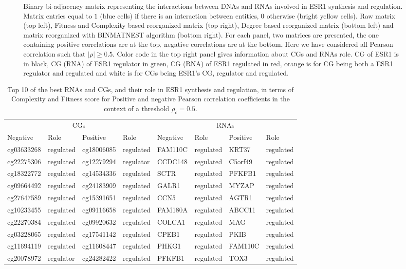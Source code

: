 \documentclass[10pt,a4paper]{article}
\begin{document}
\begin{figure}[h!]
{}
\caption{\label{fig:fig1}Binary bi-adjacency matrix representing the interactions between DNAs and RNAs involved in ESR1 synthesis and regulation. Matrix entries equal to $1$ (blue cells) if there is an interaction between entities, $0$ otherwise (bright yellow cells). Raw matrix (top left), Fitness and Complexity based reorganized matrix (top right), Degree based reorganized matrix (bottom left) and matrix reorganized with BINMATNEST algorithm (bottom right). For each panel, two matrices are presented, the one containing positive correlations are at the top, negative correlations are at the bottom. Here we have considered all Pearson correlation such that $|\rho| \geq 0.5$. Color code in the top right panel gives information about CGs and RNAs role. CG of ESR1 is in black, CG (RNA) of ESR1 regulator in green, CG (RNA) of ESR1 regulated in red, orange is for CG being both a ESR1 regulator and regulated and white is for CGs being ESR1's CG, regulator and regulated.}
\end{figure}
 \begin{table}[h!]
\centering
\caption{\label{tab:tab1}Top 10 of the best RNAs and CGs, and their role in ESR1 synthesis and regulation, in terms of Complexity and Fitness score for Positive and negative Pearson correlation coefficients in the context of a threshold $\rho_{c} = 0.5$.}
\begin{tabular}{|ll|ll|ll|ll|}
\cline{1-8}
\multicolumn{4}{|c}{CGs}&\multicolumn{4}{c|}{RNAs}\\
\cline{1-8}
Negative & Role & Positive & Role & Negative & Role & Positive & Role\\
\cline{1-8}
cg03633268 & regulated & cg18006085 & regulated & FAM110C & regulated & KRT37 & regulated\\
cg22275306 & regulated & cg12279294 & regulator & CCDC148 & regulated & C5orf49 & regulated\\
cg18322772 & regulated & cg14534336 & regulated & SCTR & regulated & PFKFB1 & regulated\\
cg09664492 & regulated & cg24183909 & regulated & GALR1 & regulated & MYZAP & regulated\\
cg27647589 & regulated & cg15391651 & regulated & CCN5 & regulated & AGTR1 & regulated\\
cg10233455 & regulated & cg09116658 & regulated & FAM180A & regulated & ABCC11 & regulated\\
cg22270384 & regulated & cg09920632 & regulated & COLCA1 & regulated & MAG & regulated\\
cg03228065 & regulated & cg17541142 & regulated & CPEB1 & regulated & PKIB & regulated\\
cg11694119 & regulated & cg11608447 & regulated & PHKG1 & regulated & FAM110C & regulated\\
cg20078972 & regulator & cg24282422 & regulated & PFKFB1 & regulated & TOX3 & regulated\\
\cline{1-8}
\end{tabular}
\end{table}
\end{document}

